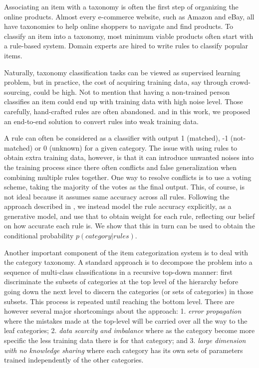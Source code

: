 
Associating an item with a taxonomy is often the first step of organizing the online products. 
Almost every e-commerce website, such as Amazon and eBay, all have taxonomies to help online shoppers to navigate and find products.
To classify an item into a taxonomy, most minimum viable products often start with a rule-based system. 
Domain experts are hired to write rules to classify popular items. 

Naturally,  taxonomy classification tasks can be viewed as supervised learning problem, 
but in practice, the cost of acquiring training data, say through crowd-sourcing, could be high. 
Not to mention that having a non-trained person classifies an item could end up with training 
data with high noise level.
Those carefully, hand-crafted rules are often abandoned.
and in this work, we proposed an end-to-end solution to convert rules into weak training data.

A rule can often be considered as a classifier with output 1 (matched), -1 (not-matched) or 0 (unknown) for a given category. The issue with using rules to obtain extra training data, however, is that it can introduce unwanted noises into the training process since there often conflicts and false generalization when combining multiple rules together. One way to resolve conflicts is to use a voting scheme, taking the majority of the votes as the final output. This, of course, is not ideal because it assumes same accuracy across all rules. Following the approach described in \cite{Ratner2016}, we instead model the rule accuracy explicitly, as a generative model, and use that to obtain weight for each rule, reflecting our belief on how accurate each rule is. We show that this in turn can be used to obtain the conditional probability $p(category | rules)$.

Another important component of the item categorization system is to deal with the category taxonomy. 
A standard approach is to decompose the problem into a sequence of multi-class classifications in a recursive top-down manner\cite{authur2010,cai2004hierarchical}: 
first discriminate the subsets of categories at the top level of the hierarchy before going down the next level to discern the categories (or sets of categories) in those subsets. This process is repeated until reaching the bottom level.  
There are however several major shortcomings about the approach: 1. \emph{error propagation} where the mistakes made at the top-level will be carried over all the way to the leaf categories; 2. \emph{data scarcity and imbalance} where as the category become more specific the less training data there is for that category; and 3. \emph{large dimension with no knowledge sharing} where each category has its own sets of parameters trained independently of the other categories.

